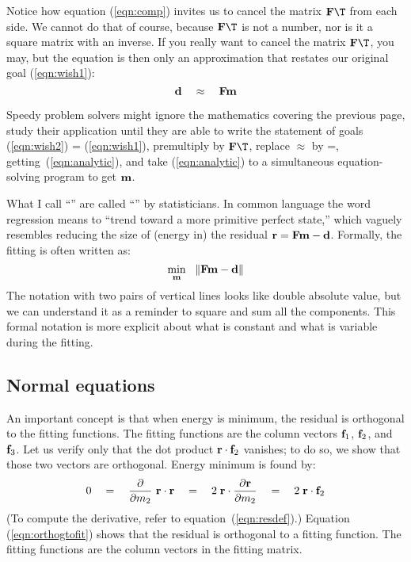 \par
Notice how equation
(\ref{eqn:comp})
invites us to cancel the matrix
$\bold F\T$
from each side.
We cannot do that of course, because
$\bold F\T$
is not a number, nor is it a square matrix with an inverse.
If you really want to cancel the matrix $\bold F\T$, you may,
but the equation is then only an approximation
that restates our original goal (\ref{eqn:wish1}):
\begin{equation}
{\bf d}  \quad \approx \quad \bold F   \bold m 
\label{eqn:wish2}
\end{equation}

\par
Speedy problem solvers might
ignore the mathematics covering the previous page,
study their application until they
are able to write the statement of goals
(\ref{eqn:wish2}) = (\ref{eqn:wish1}),
premultiply by $\bold F\T$,
replace $\approx$ by =,
getting~(\ref{eqn:analytic}),
and take
(\ref{eqn:analytic})
to a simultaneous equation-solving program to get $\bold m$.

\par
What I call ``'' are called
``'' by statisticians.
In common language the word regression means
to ``trend toward a more primitive perfect state,''
which vaguely resembles reducing the size of (energy in)
the residual $\bold r = \bold F \bold m - \bold d $.
Formally,
the fitting is often written as:
\begin{equation}
\min_{\bold m} \ \  \| \bold F \bold m - \bold d \| 
\label{eqn:norm}
\end{equation}
The notation with two pairs of vertical lines
looks like double absolute value,
but we can understand it as a reminder to square and sum all the components.
This formal notation is more explicit
about what is constant and what is variable during the fitting.

\subsection{Normal equations}
\par

An important concept is that when energy is minimum,
the residual is orthogonal to the fitting functions.
The fitting functions are the column vectors
$\bold f_1$, $\bold f_2$, and $\bold f_3$.
Let us verify only that the dot product $ \bold r \cdot \bold f_2 $ vanishes;
to do so, we show
that those two vectors are orthogonal.
Energy minimum is found by:
\begin{equation}
0  \quad = \quad {\partial\over \partial m_2}\ \bold r \cdot \bold r
   \quad = \quad 2\; \bold r \cdot {\partial \bold r\over \partial m_2}
   \quad = \quad 2\; \bold r \cdot \bold f_2
\label{eqn:orthogtofit}
\end{equation}
(To compute the derivative, refer to equation~(\ref{eqn:resdef}).)
Equation (\ref{eqn:orthogtofit}) shows that
the residual is orthogonal to a fitting function.
The fitting functions are the column vectors in the fitting matrix.

